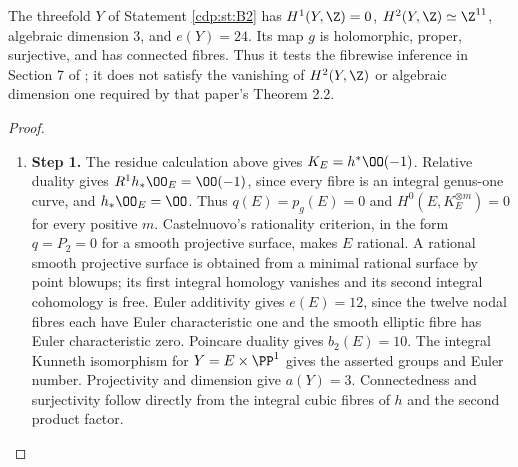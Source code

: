 \begin{proposition}\hypertarget{tag-01BM}{}\label{cdp:st:B3}

The threefold $Y$ of Statement \ref{cdp:st:B2} has $H^1(Y,\Z)=0$, $H^2(Y,\Z)\simeq\Z^{11}$, algebraic dimension $3$, and $e(Y)=24$. Its map $g$ is holomorphic, proper, surjective, and has connected fibres. Thus it tests the fibrewise inference in Section 7 of \cite{CDP20}; it does not satisfy the vanishing of $H^2(Y,\Z)$ or algebraic dimension one required by that paper's Theorem 2.2.
\end{proposition}


\begin{proof}
\begin{enumerate}[label={$\langle1\rangle$\arabic*.},leftmargin=*]
\item 
\noindent\textbf{Step 1.} The residue calculation above gives $K_E=h^*\OO(-1)$. Relative duality gives $R^1h_*\OO_E=\OO(-1)$, since every fibre is an integral genus-one curve, and $h_*\OO_E=\OO$. Thus $q(E)=p_g(E)=0$ and $H^0(E,K_E^{\otimes m})=0$ for every positive $m$. Castelnuovo's rationality criterion, in the form $q=P_2=0$ for a smooth projective surface, makes $E$ rational. A rational smooth projective surface is obtained from a minimal rational surface by point blowups; its first integral homology vanishes and its second integral cohomology is free. Euler additivity gives $e(E)=12$, since the twelve nodal fibres each have Euler characteristic one and the smooth elliptic fibre has Euler characteristic zero. Poincare duality gives $b_2(E)=10$. The integral Kunneth isomorphism for $Y=E\times\PP^1$ gives the asserted groups and Euler number. Projectivity and dimension give $a(Y)=3$. Connectedness and surjectivity follow directly from the integral cubic fibres of $h$ and the second product factor.

\end{enumerate}
\end{proof}